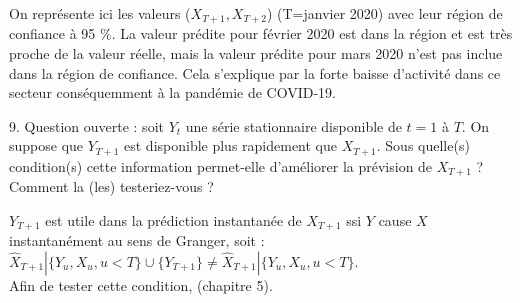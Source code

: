 \documentclass[a4paper, 12pt]{article} %
\begin{document}
\normalsize{
{On représente ici les valeurs ($X_{T+1}, X_{T+2}$) (T=janvier 2020) avec leur région de confiance à 95 \%. La valeur prédite pour février 2020 est dans la région et est très proche de la valeur réelle, mais la valeur prédite pour mars 2020 n'est pas inclue dans la région de confiance. Cela s'explique par la forte baisse d'activité dans ce secteur conséquemment à la pandémie de COVID-19.\\
}}
\begin{tcolorbox}
{\small
9. Question ouverte : soit $Y_t$ une série stationnaire disponible de $t = 1$ à $T$. On suppose que $Y_{T+1}$
est disponible plus rapidement que $X_{T+1}$. Sous quelle(s) condition(s) cette information permet-elle
d’améliorer la prévision de $X_{T+1}$ ? Comment la (les) testeriez-vous ?
}
\end{tcolorbox}

\normalsize{
{$Y_{T+1}$ est utile dans la prédiction instantanée de $X_{T+1}$ ssi $Y$ cause $X$ instantanément au sens de Granger, soit : $\hat{X}_{T+1} | \lbrace Y_u, X_u, u < T \rbrace \cup \lbrace Y_{T+1} \rbrace \neq \hat{X}_{T+1} | \lbrace Y_u, X_u, u < T \rbrace$.\\
Afin de tester cette condition, (chapitre 5).
}}
\end{document}
